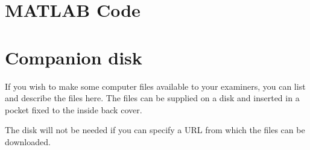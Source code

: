 \documentclass[12pt,openany,a4paper]{book}
\begin{document}
\chapter{MATLAB Code}



\chapter{Companion disk}

If you wish to make some computer files available to your examiners,
you can list and describe the files here.  The files can be supplied
on a disk and inserted in a pocket fixed to the inside back cover.

The disk will not be needed if you can specify a URL from which the
files can be downloaded.

\cleardoublepage











\end{document}
